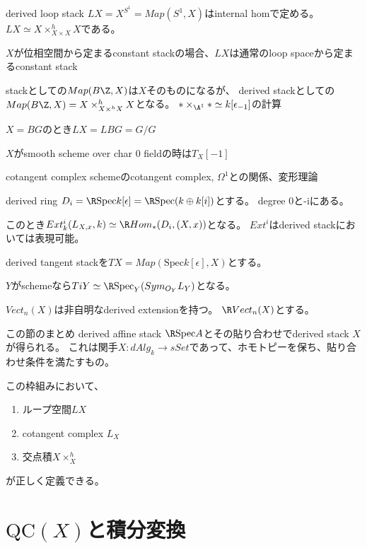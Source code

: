 \documentclass[dvipdfmx]{beamer}
\newcommand{\QC}{\mathrm{QC}}
\newcommand{\spec}{\mathrm{Spec}}
\begin{document}
\begin{frame}{derived loop stack}
$LX=X^{S^1}=Map(S^1,X)$はinternal homで定める。
$LX \simeq X\times^h_{X\times X}X$である。

$X$が位相空間から定まるconstant stackの場合、$LX$は通常のloop spaceから定まるconstant stack

stackとしての$Map(B\Z, X)$は$X$そのものになるが、
derived stackとしての$Map(B\Z, X)=X\times^h_{X\times^hX}X$となる。
$\ast \times_{\A^1}\ast\simeq k[\epsilon_{-1}]$の計算

$X=BG$のとき$LX=LBG=G/G$

$X$がsmooth scheme over char $0$ fieldの時は$T_X[-1]$
\end{frame}

\begin{frame}{cotangent complex}
schemeのcotangent complex, $\Omega^1$との関係、変形理論

derived ring $D_i=\R \spec k[\epsilon]=\R \spec (k\oplus k[i])$とする。
degree 0と-iにある。

このとき$Ext^i_k(L_{X,x},k)\simeq\R Hom_*(D_i,(X,x))$となる。
$Ext^i$はderived stackにおいては表現可能。

derived tangent stackを$TX=Map(\spec k[\epsilon], X)$とする。

$Y$がschemeなら$TiY\simeq \R \spec_Y(Sym_{O_Y}L_Y)$となる。

$Vect_n(X)$は非自明なderived extensionを持つ。
$\R Vect_n(X)$とする。
\end{frame}

\begin{frame}{この節のまとめ}
derived affine stack $\R \spec A$とその貼り合わせでderived stack $X$が得られる。
これは関手$X:dAlg_k \to sSet$であって、ホモトピーを保ち、貼り合わせ条件を満たすもの。

この枠組みにおいて、
\begin{enumerate}
\item ループ空間$LX$
\item cotangent complex $L_X$
\item 交点積$X \times^h_X$
\end{enumerate}
が正しく定義できる。
\end{frame}

\section{$\QC(X)$と積分変換}
\end{document}
